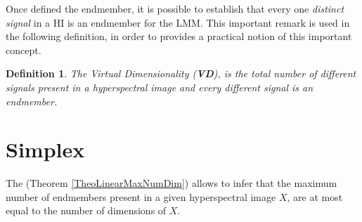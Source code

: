 \documentclass[11pt, oneside]{Thesis} %
\newtheorem{defi}{Definition}
\begin{document}
Once defined the endmember, it is possible to establish that every one \emph{distinct signal}
\cite{VD} in a HI is an endmember for the LMM. This important remark is used in the following 
definition, in order to provides a practical notion of this important concept.\\

\begin{defi}
  \label{DefVirtualDimetionality}
  The Virtual Dimensionality (\textbf{VD}), is the total number of different signals present 
  in a hyperspectral image and every different signal is an endmember.
\end{defi}

\iffalse
\section{Linear Mixing Models (LMM)}

Let $X$ be a HI. Assuming that there exists a set 
\begin{flalign}
  \label{FormulaEndmembers}
  E=\lbrace \vec{e}_1, \vec{e}_2, ..., \vec{e}_k \rbrace
\end{flalign}
of endmembers present in $X$, the LMM is a good approximation because it enables to 
decompose the remainder ($X \setminus E$) pixels as a linear combination of $E$. 
If a pixel is not an endmember then, that pixel is composed for a fraction of 
endmembers and the sum of fractions sum the total area represented by that pixel 
as is described in (Section \ref{subsectionLMM}).
\fi


\section{Simplex}

The (Theorem \ref{TheoLinearMaxNumDim}) allows to infer that the maximum number of 
endmembers present in a given hyperspectral image $X$, are at most equal to the number 
of dimensions of $X$. \\
\end{document}
